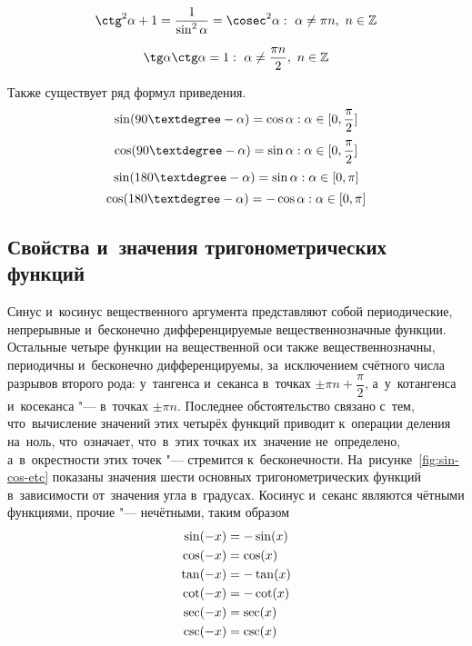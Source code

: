 \documentclass[]{scrartcl}
\begin{document}
\begin{equation}\label{eq:trigon-identity-3}
\ctg^2 \alpha + 1 = \frac{1}{\sin^2 \alpha} = \cosec^2 \alpha:\ \alpha \neq \pi n,\ n \in \mathbb{Z}
\end{equation}

\begin{equation}\label{eq:trigon-identity-4}
\tg \alpha \ctg \alpha = 1:\ \alpha \neq \frac{\pi n}{2},\ n \in \mathbb{Z}
\end{equation}

Также существует ряд формул приведения.
\begin{equation}\label{eq:trigon-identity-5}
\sin (90\textdegree-\alpha)=\cos \alpha: \alpha \in [0,\frac{\pi}{2}]
\end{equation}
\begin{equation}\label{eq:trigon-identity-6}
\cos (90\textdegree-\alpha)=\sin \alpha: \alpha \in [0,\frac{\pi}{2}]
\end{equation}
\begin{equation}\label{eq:trigon-identity-7}
\sin (180\textdegree-\alpha)=\sin \alpha: \alpha \in [0,\pi]
\end{equation}
\begin{equation}\label{eq:trigon-identity-8}
\cos (180\textdegree-\alpha)=-\cos \alpha: \alpha \in [0,\pi]
\end{equation}

\subsection{Свойства и~значения тригонометрических функций}
Синус и~косинус вещественного аргумента представляют собой периодические, непрерывные и~бесконечно дифференцируемые вещественнозначные функции. Остальные четыре функции на вещественной оси также вещественнозначны, периодичны и~бесконечно дифференцируемы, за~исключением счётного числа разрывов второго рода: у~тангенса и~секанса в~точках  $\textstyle \pm \pi n+ \dfrac{\pi}{2}$, а~у~котангенса и~косеканса "--- в~точках $\textstyle \pm \pi n$. Последнее обстоятельство связано с~тем, что~вычисление значений этих четырёх функций приводит к~операции деления на~ноль, что~означает, что~в~этих точках их~значение не~определено, а~в~окрестности этих точек "--- стремится к~бесконечности. На~рисунке~\ref{fig:sin-cos-etc} показаны значения шести основных тригонометрических функций в~зависимости от~значения угла в~градусах. Косинус и~секанс являются чётными функциями, прочие "--- нечётными, таким образом
\begin{equation}\label{eq:trigon-functions-parity}
\begin{aligned}
\sin(-x)&=-\sin(x)\\
\cos(-x)&=\cos(x)\\
\tan(-x)&=-\tan(x)\\
\cot(-x)&=-\cot(x)\\
\sec(-x)&=\sec(x)\\
\csc(-x)&=\-\csc(x)
\end{aligned}
\end{equation}
\end{document}
